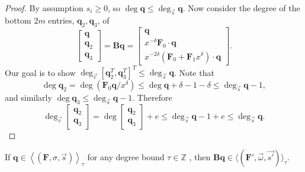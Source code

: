 \begin{proof}
By assumption $s_{i}\ge0$, so $\deg\mathbf{q}\le\deg_{\vec{s}}\mathbf{q}.$
Now consider the degree of the bottom $2m$ entries, $\mathbf{q}_{2},\mathbf{q}_{3}$,
of 
\[
\begin{bmatrix}\mathbf{q}\\
\mathbf{q}_{2}\\
\mathbf{q}_{3}
\end{bmatrix}=\mathbf{B}\mathbf{q}=\left[\begin{array}{r}
\mathbf{q}\\
x^{-\delta}\mathbf{F}_{0}\cdot\mathbf{q}\\
x^{-2\delta}\left(\mathbf{F}_{0}+\mathbf{F}_{1}x^{\delta}\right)\cdot\mathbf{q}
\end{array}\right].
\]
 Our goal is to show $\deg_{\vec{e}}\left[\mathbf{q}_{2}^{T},\mathbf{q}_{3}^{T}\right]^{T}\le\deg_{\vec{s}}\mathbf{q}$.
Note that 
\[
\deg\mathbf{q}_{2}=\deg\left(\mathbf{F}_{0}\mathbf{q}/x^{\delta}\right)\le\deg\mathbf{q}+\delta-1-\delta\le\deg_{\vec{s}}\mathbf{q}-1,
\]
 and similarly $\deg\mathbf{q}_{3}\le\deg_{\vec{s}}\mathbf{q}-1$.
Therefore 
\[
\deg_{\vec{e}}\begin{bmatrix}\mathbf{q}_{2}\\
\mathbf{q}_{3}
\end{bmatrix}=\deg\begin{bmatrix}\mathbf{q}_{2}\\
\mathbf{q}_{3}
\end{bmatrix}+e\le\deg_{\vec{s}}\mathbf{q}-1+e\le\deg_{\vec{s}}\mathbf{q}.
\]
 \end{proof}
\begin{cor}
\label{cor:sToBs}If $\mathbf{q}\in\left\langle \left(\mathbf{F},\sigma,\vec{s}\right)\right\rangle _{\tau}$
for any degree bound $\tau\in\mathbb{Z}$ , then\textup{ }$\mathbf{B}\mathbf{q}\in\langle(\mathbf{F}',\vec{\omega},\vec{s'})\rangle_{\tau}$\textup{.} 
\end{cor}

